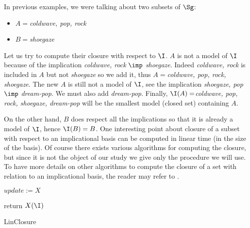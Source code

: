 \noindent In previous examples, we were talking about two subsets of $\Sg$:
\begin{itemize}
	\item $ A = $\textit{coldwave, pop, rock}
	\item $B = $\textit{shoegaze}
\end{itemize}

\noindent Let us try to compute their closure with respect to $\I$. $A$ is not
a model of $\I$ because of the implication \textit{coldwave, rock}  $\imp$ 
\textit{shoegaze}.  Indeed \textit{coldwave, rock} is included in $A$ but not
\textit{shoegaze} so we add it, thus $A = $\textit{coldwave, pop, 
rock, shoegaze}. The new $A$ is still not a model of $\I$, see the implication
\textit{shoegaze, pop} $\imp$ \textit{dream-pop}. We must also add 
\textit{dream-pop}. Finally, $\I(A) = $\textit{coldwave, pop, rock, 
shoegaze, dream-pop} will be the smallest model (closed set) containing $A$.

On the other hand, $B$ does respect all the implications so that it is already 
a model of $\I$, hence $\I(B) = B$. One interesting point about closure of a 
subset with respect to an implicational basis can be computed in linear time
(in the size of the basis). Of course there exists various algorithms for
computing the closure, but since it is not the object of our study we give
only the procedure we will use. To have more details on other algorithms
to compute the closure of a set with relation to an implicational basis, the
reader may refer to \cite{bazhanov_optimizations_2014, 
b._ganter_conceptual_2016}.

\begin{algorithm}
	
\BlankLine
\BlankLine


$update := X$ \;


return $X(\I)$ \;

	
\caption{LinClosure}
\label{alg:linclosure}
\end{algorithm}

